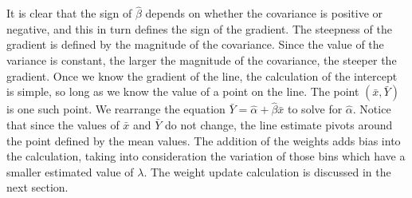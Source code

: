 \documentclass[a4paper,11pt]{article}
\begin{document}
    It is clear that the sign of $\hat{\beta}$ depends on whether the covariance
    is positive or negative, and this in turn defines the sign of the
    gradient. The steepness of the gradient is defined by the magnitude of the
    covariance. Since the value of the variance is constant, the larger the
    magnitude of the covariance, the steeper the gradient. Once we know the
    gradient of the line, the calculation of the intercept is simple, so long as
    we know the value of a point on the line. The point $(\bar{x},\bar{Y})$ is
    one such point. We rearrange the equation
    $\bar{Y}=\hat{\alpha}+\hat{\beta}\bar{x}$ to solve for
    $\hat{\alpha}$. Notice that since the values of $\bar{x}$ and $\bar{Y}$ do
    not change, the line estimate pivots around the point defined by the mean
    values. The addition of the weights adds bias into the calculation, taking
    into consideration the variation of those bins which have a smaller
    estimated value of $\lambda$. The weight update calculation is discussed in
    the next section.
\end{document}
